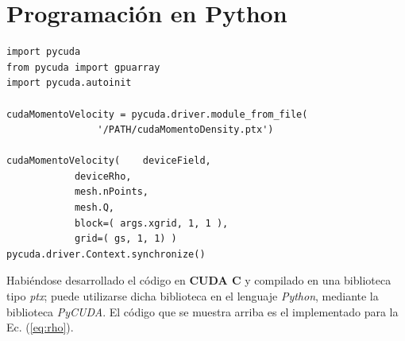 \section{Programación en Python}
{\footnotesize
	\begin{frame}{}
		\begin{lstlisting}[frame=single]
import pycuda
from pycuda import gpuarray
import pycuda.autoinit
		
cudaMomentoVelocity = pycuda.driver.module_from_file(
				'/PATH/cudaMomentoDensity.ptx')		
			
cudaMomentoVelocity(	deviceField,
			deviceRho,
			mesh.nPoints,
			mesh.Q,
			block=( args.xgrid, 1, 1 ),
			grid=( gs, 1, 1) )     			    
pycuda.driver.Context.synchronize()
		\end{lstlisting}
		
	\end{frame}
}

Habiéndose desarrollado el código en \textbf{CUDA C} y compilado en una biblioteca tipo \textit{ptx}; puede utilizarse dicha biblioteca en el lenguaje \textit{Python}, mediante la biblioteca \textit{PyCUDA}. El código que se muestra arriba es el implementado para la Ec. (\ref{eq:rho}).

